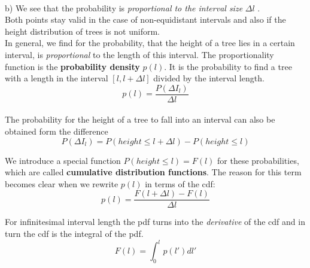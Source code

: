 \documentclass[12pt, a4paper]{scrartcl}
\begin{document}
\\

b) We see that the probability is \textit{proportional to the interval size} $\Delta l$ .\\
Both points stay valid in the case of non-equidistant intervals and also if the height
distribution of trees is not uniform.\\

In general, we ﬁnd for the probability, that the height of a tree lies in a certain interval, is \textit{proportional} to the length of this interval. The proportionality function is the \textbf{probability density} $p(l)$.
 It is the probability to ﬁnd a tree with a length in the interval $[l,l+\Delta l]$ divided by the interval length.
 \begin{equation*}\boxed{p(l)=\frac{P(\Delta I_l)}{\Delta l}
}\end{equation*}\\
The probability for the height of a tree to fall into an interval can also be obtained
form the diﬀerence
\[P(\Delta I_l)=P(height\leq l+\Delta l)-P(height \leq l)\]

We introduce a special function $P(height\leq l)=F(l)$ for these probabilities, which are called \textbf{cumulative distribution functions}.%
The reason for this term becomes clear when we rewrite $p(l)$ in
terms of the cdf:\\
\[p(l)=\frac{F(l+\Delta l)-F(l)}{\Delta l}\]

For inﬁnitesimal interval length the pdf turns into the \textit{derivative} of the cdf
and in turn the cdf is the integral of the pdf.\\
 \begin{equation*}\boxed{F(l)=\int_0^lp(l')dl'
 }\end{equation*}\\
\end{document}
